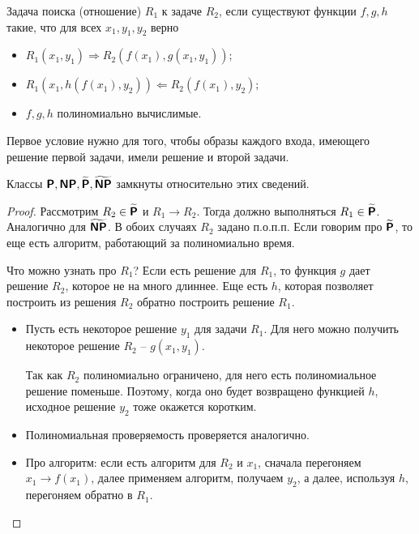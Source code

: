 \begin{defn}
	Задача поиска (отношение) $ R_1$  к задаче $ R_2$, если существуют функции $ f, g, h$ такие, что для всех  $ x_1, y_1, y_2$ верно
	\begin{itemize}
		\item $ R_1(x_1, y_1) \Longrightarrow R_2(f(x_1), g(x_1, y_1))$;
		\item $ R_1(x_1, h(f(x_1), y_2)) \Longleftarrow R_2(f(x_1), y_2)$;
		\item $ f, g, h$ полиномиально вычислимые.
	\end{itemize}
	\begin{note}
	    Первое условие нужно для того, чтобы образы каждого входа, имеющего решение первой задачи, имели решение и второй задачи.
	\end{note}
\end{defn}

\begin{thm}
	Классы $\textmd{\textbf{\textsf{P}}}, \textmd{\textbf{\textsf{NP}}}, \widetilde{\textmd{\textbf{\textsf{P}}}}, \widetilde{\textmd{\textbf{\textsf{NP}}}}$ замкнуты относительно этих сведений.
\end{thm}
\begin{proof}
	Рассмотрим $ R_2 \in \widetilde{\textmd{\textbf{\textsf{P}}}}$ и $ R_1 \to R_2$. Тогда должно выполняться $ R_1 \in \widetilde{\textmd{\textbf{\textsf{P}}}}$. Аналогично для $ \widetilde{\textmd{\textbf{\textsf{NP}}}}$. 
    В обоих случаях $ R_2$ задано п.о.п.п. Если говорим про $ \widetilde{\textmd{\textbf{\textsf{P}}}}$, то еще есть алгоритм, работающий за полиномиально время.

	Что можно узнать про $ R_1$? Если есть решение для $ R_1$, то функция $ g$ дает решение $ R_2$, которое не на много длиннее.
	Еще есть $ h$, которая позволяет построить из решения $ R_2$ обратно построить решение $ R_1$.
	\begin{itemize}
		\item Пусть есть некоторое решение $ y_1$ для задачи $ R_1$. Для него можно получить некоторое решение $ R_2$ -- $ g(x_1, y_1)$.

	Так как $ R_2$ полиномиально ограничено, для него есть полиномиальное решение поменьше. Поэтому, когда оно будет возвращено функцией $ h$, исходное решение $ y_2$ тоже окажется коротким.

		\item Полиномиальная проверяемость проверяется аналогично.

		\item Про алгоритм: если есть алгоритм для $ R_2$ и $ x_1$, сначала перегоняем $ x_1 \to  f(x_1)$, далее применяем алгоритм, получаем $ y_2$, а далее, используя $ h$, перегоняем обратно в $ R_1$.
	\end{itemize}
\end{proof}

